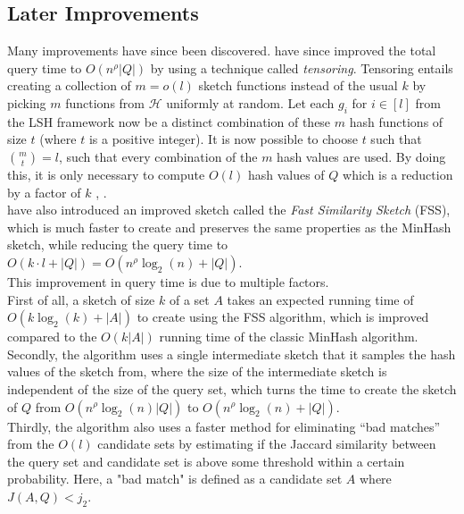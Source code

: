 \subsection{Later Improvements}
Many improvements have since been discovered.
\citet{andoni2006efficient} have since improved the total query time to $O(n^\rho|Q|)$ by using a technique called \textit{tensoring}. Tensoring entails creating a collection of $m=o(l)$ sketch functions instead of the usual $k$ by picking $m$ functions from $\mathcal{H}$ uniformly at random. Let each $g_i$ for $i\in [l]$ from the LSH framework now be a distinct combination of these $m$ hash functions of size $t$ (where $t$ is a positive integer). It is now possible to choose $t$ such that ${m \choose t} = l$, such that every combination of the $m$ hash values are used. By doing this, it is only necessary to compute $O(l)$ hash values of $Q$ which is a reduction by a factor of $k$ \cite{andoni2006efficient}, \cite{christiani2018fast}.\\
\citet{dahlgaard2017fast} have also introduced an improved sketch called the \textit{Fast Similarity Sketch} (FSS), which is much faster to create and preserves the same properties as the MinHash sketch, while reducing the query time to $O(k\cdot l + |Q|)=O(n^\rho \log_2(n) + |Q|)$. \\
This improvement in query time is due to multiple factors.\\
First of all, a sketch of size $k$ of a set $A$ takes an expected running time of $O(k\log_2(k) + |A|)$ to create using the FSS algorithm, which is improved compared to the $O(k|A|)$ running time of the classic MinHash algorithm.\\
Secondly, the algorithm uses a single intermediate sketch that it samples the hash values of the sketch from, where the size of the intermediate sketch is independent of the size of the query set, which turns the time to create the sketch of $Q$ from $O(n^\rho \log_2(n)|Q|)$ to $O(n^\rho \log_2(n) + |Q|)$.\\
Thirdly, the algorithm also uses a faster method for eliminating ``bad matches'' from the $O(l)$ candidate sets by estimating if the Jaccard similarity between the query set and candidate set is above some threshold within a certain probability. Here, a "bad match" is defined as a candidate set $A$ where $J(A, Q) < j_2$.
